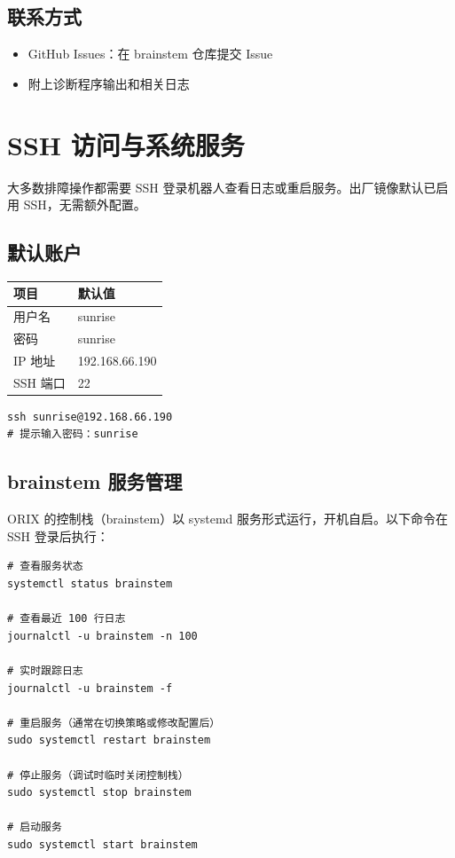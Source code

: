 \documentclass[a4paper,11pt,openany]{book}
\begin{document}
\subsection{联系方式}

\begin{itemize}[nosep]
  \item GitHub Issues：在 brainstem 仓库提交 Issue
  \item 附上诊断程序输出和相关日志
\end{itemize}

\section{SSH 访问与系统服务}

大多数排障操作都需要 SSH 登录机器人查看日志或重启服务。出厂镜像默认已启用 SSH，无需额外配置。

\subsection{默认账户}

\begin{longtable}{ll}
\toprule
项目 & 默认值 \\
\midrule
\endhead
用户名 & sunrise \\
密码 & sunrise \\
IP 地址 & 192.168.66.190 \\
SSH 端口 & 22 \\
\bottomrule
\end{longtable}

\begin{lstlisting}[style=bash]
ssh sunrise@192.168.66.190
# 提示输入密码：sunrise
\end{lstlisting}

\subsection{brainstem 服务管理}

ORIX 的控制栈（brainstem）以 systemd 服务形式运行，开机自启。以下命令在 SSH 登录后执行：

\begin{lstlisting}[style=bash]
# 查看服务状态
systemctl status brainstem

# 查看最近 100 行日志
journalctl -u brainstem -n 100

# 实时跟踪日志
journalctl -u brainstem -f

# 重启服务（通常在切换策略或修改配置后）
sudo systemctl restart brainstem

# 停止服务（调试时临时关闭控制栈）
sudo systemctl stop brainstem

# 启动服务
sudo systemctl start brainstem
\end{lstlisting}
\end{document}
